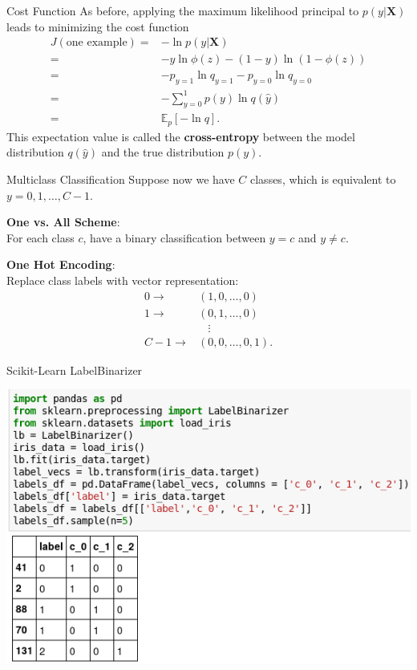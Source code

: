 \documentclass[12pt,t]{beamer}
\begin{document}
\begin{frame}{Cost Function}
As before, applying the maximum likelihood principal to $p(y|\mathbf{X}) $ leads to minimizing the cost function
\begin{equation*}\begin{split}
J (\text{one example}) =&  - \ln p(y|\mathbf{X}) \\
= &- y \ln \phi(z) - (1-y) \ln (1- \phi(z)) \\
= & - p_{y=1} \ln q_{y=1}  - p_{y=0} \ln q_{y=0} \\
= & - \sum_{y=0}^1 p(y) \ln q(\hat{y}) \\
= & \mathbb{E}_p \left[ - \ln q\right].
\end{split}\end{equation*} 
This expectation value is called the {\bf cross-entropy} between the  model distribution $q(\hat{y})$ and the true distribution $p(y)$.

\end{frame}

\begin{frame}{Multiclass Classification}
Suppose now we have $C$ classes, which is equivalent to $y = 0, 1, \ldots, C-1$.

\bigskip
{\bf One vs. All Scheme}: \\
For each class $c$, have a binary classification between $y=c$ and $y \neq c$.

\bigskip
{\bf One Hot Encoding}:\\
Replace class labels with vector representation:
\begin{equation*}\begin{split} 
0 \rightarrow  &(1, 0, \ldots, 0) \\
1 \rightarrow & (0, 1, \ldots, 0) \\
&~~~~ \vdots \\
C-1  \rightarrow &(0, 0, \ldots, 0,1 ).
\end{split}\end{equation*} 

\end{frame}

\begin{frame}{Scikit-Learn LabelBinarizer}

\centerline{
\includegraphics[height=0.7\textheight]{labelbinarizer.png}
}


\end{frame}
\end{document}
